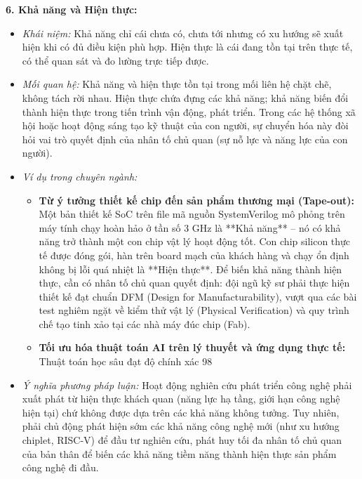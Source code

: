 \documentclass[12pt,a4paper]{article}
\begin{document}
{\noindent
\textbf{6. Khả năng và Hiện thực:}
\begin{itemize}
    \item \textit{Khái niệm:} Khả năng chỉ cái chưa có, chưa tới nhưng có xu hướng sẽ xuất hiện khi có đủ điều kiện phù hợp. Hiện thực là cái đang tồn tại trên thực tế, có thể quan sát và đo lường trực tiếp được.
    \item \textit{Mối quan hệ:} Khả năng và hiện thực tồn tại trong mối liên hệ chặt chẽ, không tách rời nhau. Hiện thực chứa đựng các khả năng; khả năng biến đổi thành hiện thực trong tiến trình vận động, phát triển. Trong các hệ thống xã hội hoặc hoạt động sáng tạo kỹ thuật của con người, sự chuyển hóa này đòi hỏi vai trò quyết định của nhân tố chủ quan (sự nỗ lực và năng lực của con người).
    \item \textit{Ví dụ trong chuyên ngành:}
    \begin{itemize}
        \item \textbf{Từ ý tưởng thiết kế chip đến sản phẩm thương mại (Tape-out):} Một bản thiết kế SoC trên file mã nguồn SystemVerilog mô phỏng trên máy tính chạy hoàn hảo ở tần số 3 GHz là **Khả năng** -- nó có khả năng trở thành một con chip vật lý hoạt động tốt. Con chip silicon thực tế được đóng gói, hàn trên board mạch của khách hàng và chạy ổn định không bị lỗi quá nhiệt là **Hiện thực**. Để biến khả năng thành hiện thực, cần có nhân tố chủ quan quyết định: đội ngũ kỹ sư phải thực hiện thiết kế đạt chuẩn DFM (Design for Manufacturability), vượt qua các bài test nghiêm ngặt về kiểm thử vật lý (Physical Verification) và quy trình chế tạo tinh xảo tại các nhà máy đúc chip (Fab).
        \item \textbf{Tối ưu hóa thuật toán AI trên lý thuyết và ứng dụng thực tế:} Thuật toán học sâu đạt độ chính xác 98%
    \end{itemize}
    \item \textit{Ý nghĩa phương pháp luận:} Hoạt động nghiên cứu phát triển công nghệ phải xuất phát từ hiện thực khách quan (năng lực hạ tầng, giới hạn công nghệ hiện tại) chứ không được dựa trên các khả năng không tưởng. Tuy nhiên, phải chủ động phát hiện sớm các khả năng công nghệ mới (như xu hướng chiplet, RISC-V) để đầu tư nghiên cứu, phát huy tối đa nhân tố chủ quan của bản thân để biến các khả năng tiềm năng thành hiện thực sản phẩm công nghệ đi đầu.
\end{itemize}

}
\end{document}
